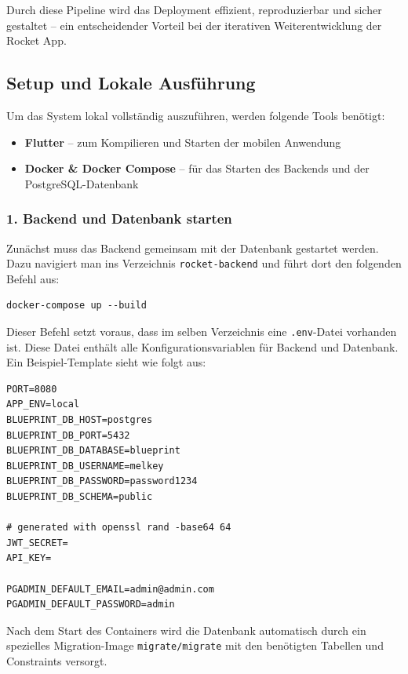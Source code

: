 \documentclass[11pt,a4paper]{article}
\begin{document}
Durch diese Pipeline wird das Deployment effizient, reproduzierbar und sicher gestaltet – ein entscheidender Vorteil bei der iterativen Weiterentwicklung der Rocket App.

\subsection{Setup und Lokale Ausführung}
Um das System lokal vollständig auszuführen, werden folgende Tools benötigt:

\begin{itemize}
    \item \textbf{Flutter} -- zum Kompilieren und Starten der mobilen Anwendung
    \item \textbf{Docker \& Docker Compose} -- für das Starten des Backends und der PostgreSQL-Datenbank
\end{itemize}

\subsubsection{1. Backend und Datenbank starten}

Zunächst muss das Backend gemeinsam mit der Datenbank gestartet werden. Dazu navigiert man ins Verzeichnis \texttt{rocket-backend} und führt dort den folgenden Befehl aus:

\begin{verbatim}
docker-compose up --build
\end{verbatim}

Dieser Befehl setzt voraus, dass im selben Verzeichnis eine \texttt{.env}-Datei vorhanden ist. Diese Datei enthält alle Konfigurationsvariablen für Backend und Datenbank. Ein Beispiel-Template sieht wie folgt aus:

\begin{verbatim}
PORT=8080
APP_ENV=local
BLUEPRINT_DB_HOST=postgres
BLUEPRINT_DB_PORT=5432
BLUEPRINT_DB_DATABASE=blueprint
BLUEPRINT_DB_USERNAME=melkey
BLUEPRINT_DB_PASSWORD=password1234
BLUEPRINT_DB_SCHEMA=public

# generated with openssl rand -base64 64
JWT_SECRET=
API_KEY=

PGADMIN_DEFAULT_EMAIL=admin@admin.com
PGADMIN_DEFAULT_PASSWORD=admin
\end{verbatim}

Nach dem Start des Containers wird die Datenbank automatisch durch ein spezielles Migration-Image \texttt{migrate/migrate}\cite{migrate} mit den benötigten Tabellen und Constraints versorgt.
\end{document}

